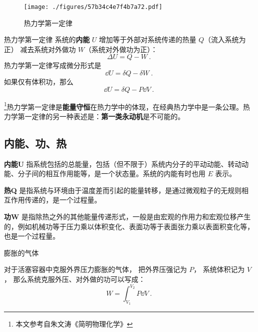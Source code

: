 
\begin{issues}
\issueDraft
\end{issues}


\begin{figure}[ht]
\centering
\texttt{[image: ./figures/57b34c4e7f4b7a72.pdf]}
\caption{热力学第一定律} \label{fig_Th1Law_1}
\end{figure}

\begin{theorem}{热力学第一定律}
系统的\textbf{内能} $U$ 增加等于外部对系统传递的热量 $Q$（流入系统为正） 减去系统对外做功 $W$（系统对外做功为正）：
\begin{equation}\label{eq_Th1Law_1}
\Delta U = Q - W~.
\end{equation}
热力学第一定律写成微分形式是
\begin{equation} \label{eq_Th1Law_2}
\dd U = \delta Q - \delta W~.
\end{equation}
如果仅有体积功，那么
\begin{equation}
\dd U = \delta Q - P \dd V~.
\end{equation}
\end{theorem}

\footnote{本文参考自朱文涛《简明物理化学》}热力学第一定律是\textbf{能量守恒}在热力学中的体现，在经典热力学中是一条公理。热力学第一定律的另一种表述是：\textbf{第一类永动机}是不可能的。

\subsection{内能、功、热}
\textbf{内能U} 指系统包括的总能量，包括（但不限于）系统内分子的平动动能、转动动能、分子间的相互作用能等，是一个状态量。系统的内能有时也用 $E$ 表示。 

\textbf{热Q} 是指系统与环境由于温度差而引起的能量转移，是通过微观粒子的无规则相互作用传递的，是一个过程量。

\textbf{功W} 是指除热之外的其他能量传递形式，一般是由宏观的作用力和宏观位移产生的，例如机械功等于压力乘以体积变化、表面功等于表面张力乘以表面积变化等，也是一个过程量。

\begin{example}{膨胀的气体}

对于活塞容器中克服外界压力膨胀的气体， 把外界压强记为 $P$， 系统体积记为 $V$， 那么系统克服外压、对外做的功可以写成：
\begin{equation}
W = \int_{V_1}^{V_2} P \dd{V}~.
\end{equation}
\end{example}

